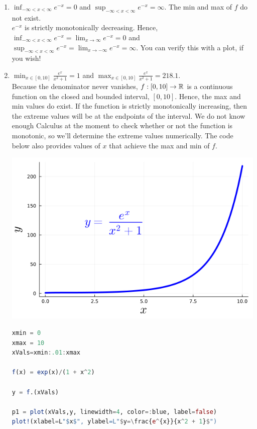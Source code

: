 \begin{enumerate}
\renewcommand{\labelenumi}{(\alph{enumi})}
\setlength{\itemsep}{.2cm}
    \item  \Ans $\displaystyle \inf_{-\infty < x < \infty} e^{-x} = 0$ and $\displaystyle \sup_{-\infty < x < \infty} e^{-x} = \infty$. The min and max of $f$ do not exist.\\

    $e^{-x}$ is strictly monotonically decreasing. Hence, $\displaystyle \inf_{-\infty < x < \infty} e^{-x} = \lim_{x \to \infty} e^{-x} = 0$ and  $\displaystyle \sup_{-\infty < x < \infty} e^{-x} = \lim_{x \to -\infty} e^{-x} = \infty$. You can verify this with a plot, if you wish!

    \item  \Ans   $\displaystyle \min_{x \in [0, 10]} \frac{e^{x}}{x^2 + 1} = 1$ and  $\displaystyle \max_{x \in [0, 10]} \frac{e^{x}}{x^2 + 1} = 218.1$.\\
    
    Because the denominator never vanishes, $f:[0, 10] \to \mathbb R$ is a continuous function on the closed and bounded interval, $[0, 10]$. Hence, the max and min values do exist. If the function is strictly monotonically increasing, then the extreme values will be at the endpoints of the interval. We do not know enough Calculus at the moment to check whether or not the function is monotonic, so we'll determine the extreme values numerically. The code below also provides values of $x$ that achieve the max and min of $f$. 

    
    \begin{center}
    \includegraphics[width=0.45\columnwidth]{graphics/Chap04/MaxMinB.png}
    \end{center}

\begin{lstlisting}[language=Julia,style=mystyle]
xmin = 0
xmax = 10
xVals=xmin:.01:xmax

f(x) = exp(x)/(1 + x^2)

y = f.(xVals)

p1 = plot(xVals,y, linewidth=4, color=:blue, label=false)
plot!(xlabel=L"$x$", ylabel=L"$y=\frac{e^{x}}{x^2 + 1}$") 



\end{lstlisting}
\end{enumerate}
